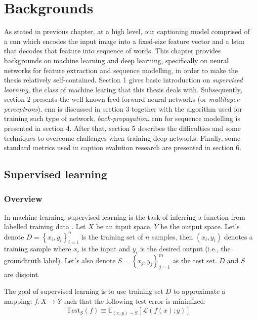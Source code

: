 \chapter{Backgrounds}

\nocite{DBLP:journals/corr/Lipton15}

As stated in previous chapter, at a high level, our captioning model comprised of a \gls{cnn} which encodes the input image into a fixed-size feature vector and a \gls{lstm} that decodes that feature into sequence of words. This chapter provides backgrounds on machine learning and deep learning, specifically on neural networks for feature extraction and sequence modelling, in order to make the thesis relatively self-contained. Section 1 gives basic introduction on \textit{supervised learning}, the class of machine learing that this thesis deals with. Subsequently, section 2 presents the well-known feed-forward neural networks (or \textit{multilayer perceptrons}). \gls{cnn} is discussed in section 3 together with the algorithm used for training such type of network, \textit{back-propagation}. \gls{rnn} for sequence modelling is presented in section 4. After that, section 5 describes the difficulties and some techniques to overcome challenges when training deep networks. Finally, some standard metrics used in caption evalution research are presented in section 6.

\section{Supervised learning}
\subsection{Overview}
In machine learning, supervised learning is the task of inferring a function from labelled training data \cite{INSR:INSR95_18}. Let $X$ be an input space, $Y$ be the output space. Let's denote $D = \left\{ x_i, y_i\right\}_{i=1}^n$ is the training set of $n$ samples, then $\left(x_i, y_i\right)$ denotes a training sample where $x_i$ is the input and $y_i$ is the desired output (i.e., the groundtruth label). Let's also denote $S = \left\{ x_j, y_j\right\}_{j=1}^m$ as the test set. $D$ and $S$ are disjoint.

The goal of supervised learning is to use training set $D$ to approximate a mapping: $f: X \to Y$ such that the following test error is minimized:
\begin{align}
	\text{Test}_S\left(f\right) \equiv \mathbb{E}_{\left(x, y\right)\sim S}\left[\mathcal{L}\left(f\left(x\right); y\right)\right]
\end{align}

